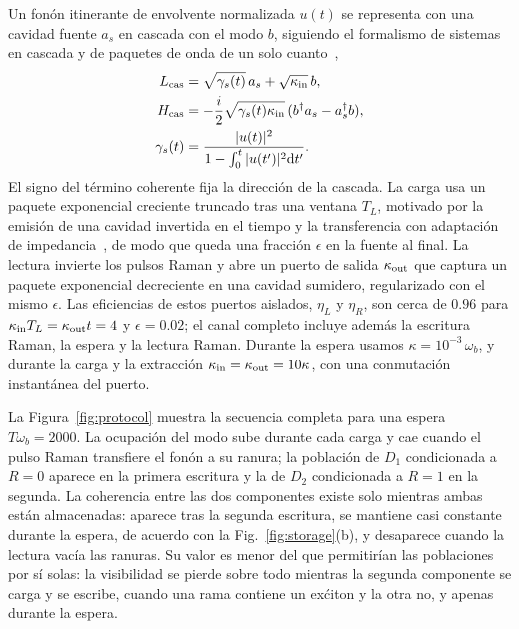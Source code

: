 \documentclass[aps,pra,twocolumn,groupedaddress,amsmath,amssymb,floatfix]{revtex4-2}
\begin{document}
Un fon\'on itinerante de envolvente normalizada $u(t)$ se representa con una cavidad fuente $a_s$ en cascada con el modo $b$, siguiendo el formalismo de sistemas en cascada y de paquetes de onda de un solo cuanto~\cite{gardiner1993,carmichael1993,gough2012},
\begin{align}
L_{\rm cas}&=\sqrt{\gamma_s(t)}\,a_s+\sqrt{\kappa_{\rm in}}\,b,\nonumber\\
H_{\rm cas}&=-\frac i2\sqrt{\gamma_s(t)\kappa_{\rm in}}\,(b^\dagger a_s-a_s^\dagger b),\nonumber\\
\gamma_s(t)&=\frac{|u(t)|^2}{1-\int_0^t|u(t')|^2\mathrm dt'}.\label{eq:cascade}
\end{align}
El signo del t\'ermino coherente fija la direcci\'on de la cascada. La carga usa un paquete exponencial creciente truncado tras una ventana $T_L$, motivado por la emisi\'on de una cavidad invertida en el tiempo y la transferencia con adaptaci\'on de impedancia~\cite{cirac1997}, de modo que queda una fracci\'on $\epsilon$ en la fuente al final. La lectura invierte los pulsos Raman y abre un puerto de salida $\kappa_{\rm out}$ que captura un paquete exponencial decreciente en una cavidad sumidero, regularizado con el mismo $\epsilon$. Las eficiencias de estos puertos aislados, $\eta_L$ y $\eta_R$, son cerca de $0.96$ para $\kappa_{\rm in}T_L=\kappa_{\rm out}t=4$ y $\epsilon=0.02$; el canal completo incluye adem\'as la escritura Raman, la espera y la lectura Raman. Durante la espera usamos $\kappa=10^{-3}\,\omega_b$, y durante la carga y la extracci\'on $\kappa_{\rm in}=\kappa_{\rm out}=10\kappa$, con una conmutaci\'on instant\'anea del puerto.

La Figura~\ref{fig:protocol} muestra la secuencia completa para una espera $T\omega_b=2000$. La ocupaci\'on del modo sube durante cada carga y cae cuando el pulso Raman transfiere el fon\'on a su ranura; la poblaci\'on de $D_1$ condicionada a $R=0$ aparece en la primera escritura y la de $D_2$ condicionada a $R=1$ en la segunda. La coherencia entre las dos componentes existe solo mientras ambas est\'an almacenadas: aparece tras la segunda escritura, se mantiene casi constante durante la espera, de acuerdo con la Fig.~\ref{fig:storage}(b), y desaparece cuando la lectura vac\'ia las ranuras. Su valor es menor del que permitir\'ian las poblaciones por s\'i solas: la visibilidad se pierde sobre todo mientras la segunda componente se carga y se escribe, cuando una rama contiene un ex\'citon y la otra no, y apenas durante la espera.
\end{document}
